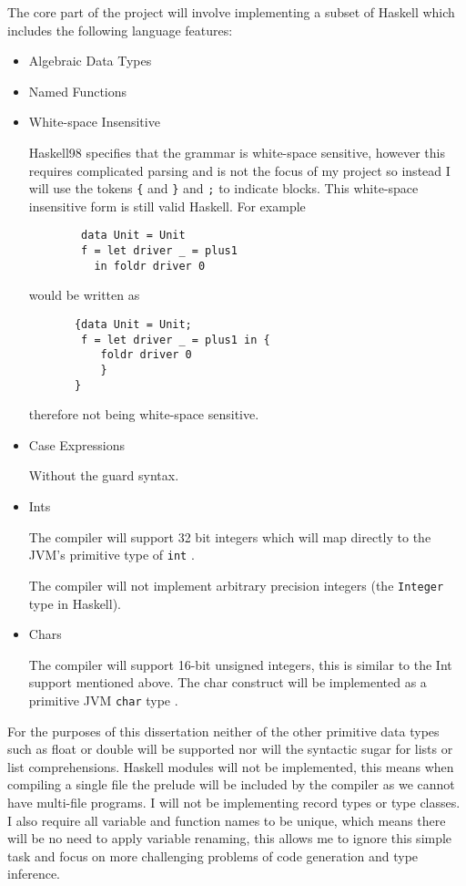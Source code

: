 \documentclass[a4paper]{article}
\begin{document}
  The core part of the project will involve implementing a subset of Haskell which includes the following language features:
  \begin{itemize}
    \item Algebraic Data Types

    \item Named Functions


    \item White-space Insensitive

      Haskell98 specifies that the grammar is white-space sensitive, however this requires complicated parsing and is not the focus of my project so instead I will
      use the tokens \texttt{\{} and \texttt{\}} and \texttt{;} to indicate blocks. This white-space insensitive form is still valid Haskell.
      For example
      \begin{verbatim}
        data Unit = Unit
        f = let driver _ = plus1
          in foldr driver 0
      \end{verbatim}
      would be written as
      \begin{verbatim}
       {data Unit = Unit;
        f = let driver _ = plus1 in {
           foldr driver 0
           }
       }
      \end{verbatim}
      therefore not being white-space sensitive.

    \item Case Expressions

      Without the guard syntax.

    \item Ints

      The compiler will support 32 bit integers which will map directly to the JVM's primitive type of \texttt{int} \cite{jvm-spec8}.

      The compiler will not implement arbitrary precision integers (the \texttt{Integer} type in Haskell).

    \item Chars

      The compiler will support 16-bit unsigned integers, this is similar to the Int support mentioned above. The char construct will be implemented as a
      primitive JVM \texttt{char} type \cite{jvm-spec8}.


  \end{itemize}
  For the purposes of this dissertation neither of the other primitive data types such as float or double will be supported nor will the syntactic sugar for lists 
  or list comprehensions.
  Haskell modules will not be implemented, this means when compiling a single file the prelude will be included by the compiler as we cannot have multi-file programs.
  I will not be implementing record types or type classes. I also require all variable and function names to be unique, which means there will be no need to apply 
  variable renaming, this allows me to ignore this simple task and focus on more challenging problems of code generation and type inference.
\end{document}
